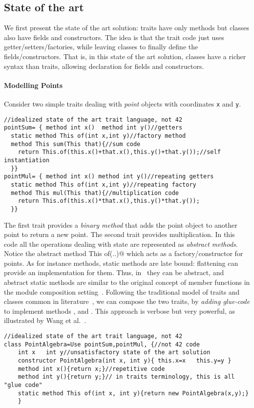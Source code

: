 \subsection{State of the art}
We first present the state of the art solution: 
traits have only methods but classes also have fields and constructors.
The idea is that the trait code just uses getter/setters/factories, while leaving
classes to finally define the fields/constructors. That
is, in this state of the art solution, classes have a richer syntax than traits, allowing
declaration for fields and constructors. 

\paragraph{Modelling Points} Consider two simple 
traits dealing with \emph{point} objects with coordinates \lstinline{x} and
\lstinline{y}.
\saveSpace\saveSpace
\begin{lstlisting}
//idealized state of the art trait language, not 42
pointSum= { method int x()  method int y()//getters
  static method This of(int x,int y)//factory method
  method This sum(This that){//sum code
    return This.of(this.x()+that.x(),this.y()+that.y());//self instantiation
  }}
pointMul= { method int x() method int y()//repeating getters
  static method This of(int x,int y)//repeating factory
  method This mul(This that){//multiplication code
    return This.of(this.x()*that.x(),this.y()*that.y());
  }}
\end{lstlisting}
\saveSpace\saveSpace
The first trait provides a \emph{binary method} that 
adds the point object to another point to return a new point. 
The second trait provides multiplication.
\noindent In this code all the operations dealing with state are represented as \emph{abstract methods}.
Notice the abstract \Q@static method This of(..)@ which acts as a factory/constructor
for points. 
As for instance methods, static methods are late bound:  flattening can provide an implementation for them.
Thus, in \name\ they can be abstract, and abstract static methods are similar to the original concept of member functions in the module composition setting~\cite{ancona2002calculus}.
Following the traditional model of traits and classes common in literature~\cite{ducasse2006traits},
we can compose the two traits, by \emph{adding glue-code}
to implement methods \Q@x@, \Q@y@ and \Q@of@.
This approach is verbose but very
powerful, as illustrated by Wang et al.~\cite{wang2016classless}.
\saveSpace\saveSpace
\begin{lstlisting}
//idealized state of the art trait language, not 42
class PointAlgebra=Use pointSum,pointMul, {//not 42 code
    int x   int y//unsatisfactory state of the art solution
    constructor PointAlgebra(int x, int y){ this.x=x   this.y=y }
    method int x(){return x;}//repetitive code
    method int y(){return y;}// in traits terminology, this is all "glue code"
    static method This of(int x, int y){return new PointAlgebra(x,y);}
    }
\end{lstlisting}
\saveSpace\saveSpace

